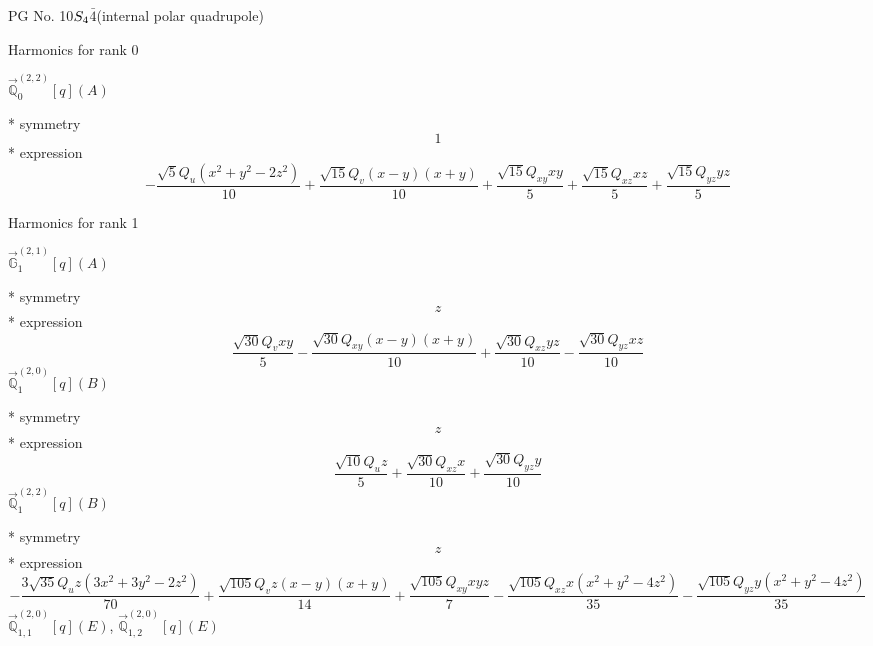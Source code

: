 \documentclass[fleqn,8pt]{jsarticle}
\begin{document}
\setcounter{MaxMatrixCols}{32}

\renewcommand{\tablename}{Table~}
\renewcommand{\figurename}{Figure~}
\begin{center}
\LARGE
PG No. 10\quad$S_{\rm 4}$\quad$\bar{4}$\quad[ tetragonal ] (internal polar quadrupole)
\end{center}

\noindent * Harmonics for rank 0

\noindent\quad $\vec{\mathbb{Q}}_{0}^{(2,2)}[q](A)$

\noindent\quad ** symmetry
\begin{dmath*}
1
\end{dmath*}
\noindent\quad ** expression
\begin{dmath*}
- \frac{\sqrt{5} Q_{u} \left(x^{2} + y^{2} - 2 z^{2}\right)}{10} + \frac{\sqrt{15} Q_{v} \left(x - y\right) \left(x + y\right)}{10} + \frac{\sqrt{15} Q_{xy} x y}{5} + \frac{\sqrt{15} Q_{xz} x z}{5} + \frac{\sqrt{15} Q_{yz} y z}{5}
\end{dmath*}

\noindent * Harmonics for rank 1

\noindent\quad $\vec{\mathbb{G}}_{1}^{(2,1)}[q](A)$

\noindent\quad ** symmetry
\begin{dmath*}
z
\end{dmath*}
\noindent\quad ** expression
\begin{dmath*}
\frac{\sqrt{30} Q_{v} x y}{5} - \frac{\sqrt{30} Q_{xy} \left(x - y\right) \left(x + y\right)}{10} + \frac{\sqrt{30} Q_{xz} y z}{10} - \frac{\sqrt{30} Q_{yz} x z}{10}
\end{dmath*}
\noindent\quad $\vec{\mathbb{Q}}_{1}^{(2,0)}[q](B)$

\noindent\quad ** symmetry
\begin{dmath*}
z
\end{dmath*}
\noindent\quad ** expression
\begin{dmath*}
\frac{\sqrt{10} Q_{u} z}{5} + \frac{\sqrt{30} Q_{xz} x}{10} + \frac{\sqrt{30} Q_{yz} y}{10}
\end{dmath*}
\noindent\quad $\vec{\mathbb{Q}}_{1}^{(2,2)}[q](B)$

\noindent\quad ** symmetry
\begin{dmath*}
z
\end{dmath*}
\noindent\quad ** expression
\begin{dmath*}
- \frac{3 \sqrt{35} Q_{u} z \left(3 x^{2} + 3 y^{2} - 2 z^{2}\right)}{70} + \frac{\sqrt{105} Q_{v} z \left(x - y\right) \left(x + y\right)}{14} + \frac{\sqrt{105} Q_{xy} x y z}{7} - \frac{\sqrt{105} Q_{xz} x \left(x^{2} + y^{2} - 4 z^{2}\right)}{35} - \frac{\sqrt{105} Q_{yz} y \left(x^{2} + y^{2} - 4 z^{2}\right)}{35}
\end{dmath*}
\noindent\quad $\vec{\mathbb{Q}}_{1,1}^{(2,0)}[q](E)$, $\vec{\mathbb{Q}}_{1,2}^{(2,0)}[q](E)$
\end{document}

